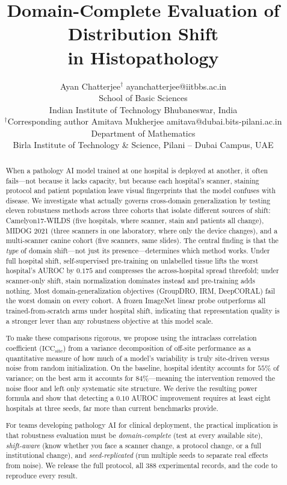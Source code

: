 \documentclass[10pt]{article} %
\title{Domain-Complete Evaluation of Distribution Shift\\in Histopathology}
\author{\name Ayan Chatterjee$^{\dagger}$ \email ayanchatterjee@iitbbs.ac.in \\
      \addr School of Basic Sciences \\
      Indian Institute of Technology Bhubaneswar, India \\
      {\normalfont\footnotesize $^{\dagger}$Corresponding author}
      \AND
      \name Amitava Mukherjee \email amitava@dubai.bits-pilani.ac.in \\
      \addr Department of Mathematics \\
      Birla Institute of Technology \& Science, Pilani -- Dubai Campus, UAE}
\begin{document}
\maketitle

\begin{abstract}
When a pathology AI model trained at one hospital is deployed at another, it
often fails---not because it lacks capacity, but because each hospital's
scanner, staining protocol and patient population leave visual fingerprints
that the model confuses with disease. We investigate what actually governs
cross-domain generalization by testing eleven robustness methods across three
cohorts that isolate different sources of shift: Camelyon17-WILDS (five
hospitals, where scanner, stain and patients all change), MIDOG 2021 (three
scanners in one laboratory, where only the device changes), and a multi-scanner
canine cohort (five scanners, same slides). The central finding is that the
\emph{type} of domain shift---not just its presence---determines which method
works. Under full hospital shift, self-supervised pre-training on unlabelled
tissue lifts the worst hospital's AUROC by $0.175$ and compresses the
across-hospital spread threefold; under scanner-only shift, stain normalization
dominates instead and pre-training adds nothing. Most domain-generalization
objectives (GroupDRO, IRM, DeepCORAL) fail the worst domain on every cohort. A
frozen ImageNet linear probe outperforms all trained-from-scratch arms under
hospital shift, indicating that representation quality is a stronger lever than
any robustness objective at this model scale.

To make these comparisons rigorous, we propose using the intraclass correlation
coefficient ($\mathrm{ICC}_{\mathrm{site}}$) from a variance decomposition of
off-site performance as a quantitative measure of how much of a model's
variability is truly site-driven versus noise from random initialization. On
the baseline, hospital identity accounts for $55\%$ of variance; on the best
arm it accounts for $84\%$---meaning the intervention removed the noise floor
and left only systematic site structure. We derive the resulting power formula
and show that detecting a $0.10$ AUROC improvement requires at least eight
hospitals at three seeds, far more than current benchmarks provide.

For teams developing pathology AI for clinical deployment, the practical
implication is that robustness evaluation must be \emph{domain-complete} (test
at every available site), \emph{shift-aware} (know whether you face a scanner
change, a protocol change, or a full institutional change), and
\emph{seed-replicated} (run multiple seeds to separate real effects from
noise). We release the full protocol, all 388 experimental records, and the
code to reproduce every result.
\end{abstract}
\end{document}
